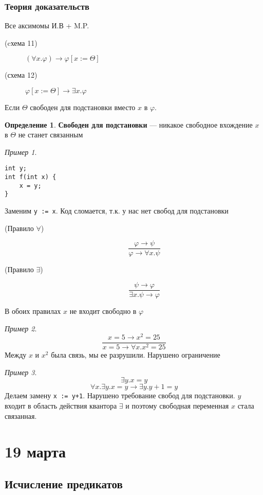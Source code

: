 \documentclass[oneside]{book}
\theoremstyle{plain}
\theoremstyle{remark}
\newtheorem*{examp}{Пример}
\theoremstyle{definition}
\newtheorem*{definition}{Определение}
\begin{document}
\subsection{Теория доказательств}
\label{sec:org19c13bd}
Все аксимомы И.В + M.P.
\begin{description}
\item[{(cхема 11)}] \((\forall x. \varphi) \to \varphi[x:=\Theta]\)
\item[{(схема 12)}] \(\varphi[x:=\Theta]\to \exists x. \varphi\)
\end{description}
Если \(\Theta\) свободен для подстановки вместо \(x\) в \(\varphi\).
\begin{definition}
\textbf{Свободен для подстановки} --- никакое свободное вхождение \(x\) в \(\Theta\) не станет связанным
\end{definition}
\begin{examp}
\-
\begin{verbatim}
int y;
int f(int x) {
	x = y;
}
\end{verbatim}
Заменим \texttt{y := x}. Код сломается, т.к. у нас нет свобод для подстановки
\end{examp}
\begin{description}
\item[{(Правило \(\forall\))}] \[\frac{\varphi \to \psi}{\varphi \to \forall x. \psi}\]
\item[{(Правило \(\exists\))}] \[ \frac{\psi \to \varphi}{\exists x.\psi \to \varphi} \]
\end{description}
В обоих правилах \(x\) не входит свободно в \(\varphi\)
\begin{examp}
\[ \frac{x = 5 \to x^2 = 25}{x = 5 \to \forall x. x^2 = 25} \]
Между \(x\) и \(x^2\) была связь, мы ее разрушили. Нарушено ограничение
\end{examp}
\begin{examp}
\[ \exists y. x = y \]
\[ \forall x. \exists y. x = y \to \exists y. y + 1 = y \]
Делаем замену \texttt{x := y+1}. Нарушено требование свобод для подстановки. \(y\) входит в область действия квантора \(\exists\) и поэтому свободная переменная \(x\) стала связанная.
\end{examp}
\chapter{19 марта}
\label{sec:orga4f5a0c}
\section{Исчисление предикатов}
\label{sec:org53c56fd}
\end{document}
